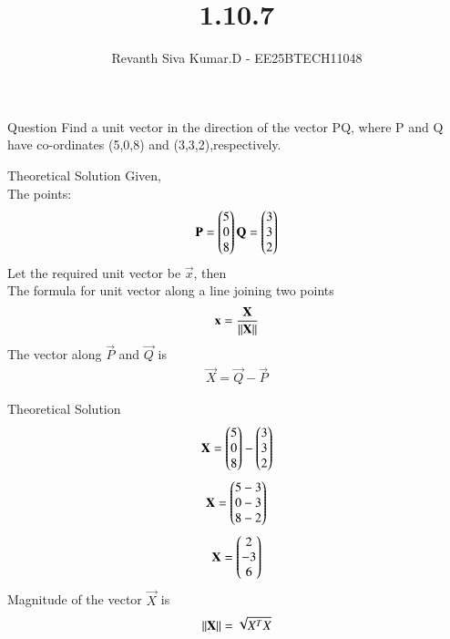 \documentclass{beamer}
\title %
{1.10.7}
\author %
{Revanth Siva Kumar.D - EE25BTECH11048}
\begin{document}
	
	\frame{\titlepage}
	\begin{frame}{Question}
		Find a unit vector in the direction of the vector PQ, where P and Q have co-ordinates (5,0,8) and (3,3,2),respectively.
	\end{frame}

	
\begin{frame}{Theoretical Solution}
	Given,\\
         The points: 
         \begin{align}
             \mathbf{P}=\begin{pmatrix}5\\0\\8\end{pmatrix} \mathbf{Q}=\begin{pmatrix}3\\3\\2\end{pmatrix}
         \end{align}
         Let the required unit vector be $\vec{x}$, then\\ 
         The formula for unit vector along a line joining two points
         \begin{align}
             \mathbf{x}=\frac{\mathbf{X}}{\left\lVert\mathbf{X}\right\rVert}
         \end{align}
         The vector along $\vec{P}$ and $\vec{Q}$ is\\
         \begin{align}
             \vec{X}=\vec{Q}-\vec{P}
         \end{align}
\end{frame}
\begin{frame}{Theoretical Solution}
\begin{align}
             \mathbf{X}=\begin{pmatrix}5\\0\\8\end{pmatrix}-\begin{pmatrix}3\\3\\2\end{pmatrix}
         \end{align}
         \begin{align}
             \mathbf{X}=\begin{pmatrix}5-3\\0-3\\8-2\end{pmatrix}
         \end{align}
         \begin{align}
             \mathbf{X}=\begin{pmatrix}2\\-3\\6\end{pmatrix}
         \end{align}
         Magnitude of the vector $\vec{X}$ is\\
         \begin{align}
             \left\lVert\mathbf{X}\right\rVert=\sqrt{X^T X}
         \end{align}
	\end{frame}
\end{document}
